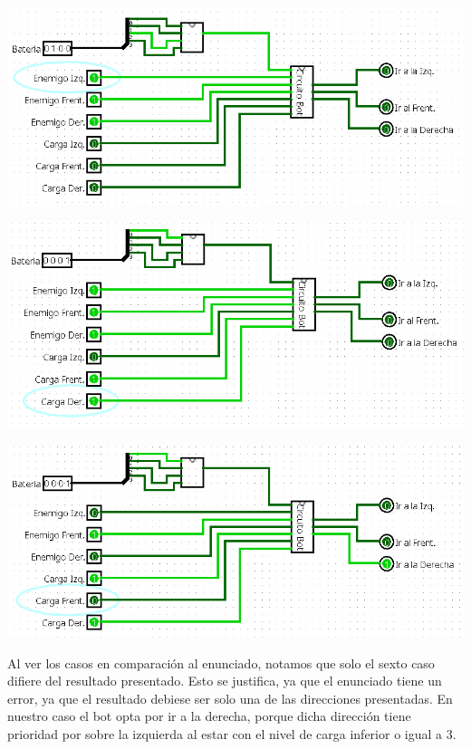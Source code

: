 \documentclass[a4paper]{article}
\begin{document}
\begin{center}
    \includegraphics[width=1\textwidth]{tarea-1-ej-4.png} %
\end{center}
\begin{center}
    \includegraphics[width=1\textwidth]{tarea-1-ej-5.png} %
\end{center}
\begin{center}
    \includegraphics[width=1\textwidth]{tarea-1-ej-6.png} %
\end{center}
Al ver los casos en comparación al enunciado, notamos que solo el sexto caso difiere del resultado presentado. Esto se justifica, ya que el enunciado tiene un error, ya que el resultado debiese ser solo una de las direcciones presentadas. En nuestro caso el bot opta por ir a la derecha, porque dicha dirección tiene prioridad por sobre la izquierda al estar con el nivel de carga inferior o igual a 3.
\end{document}
